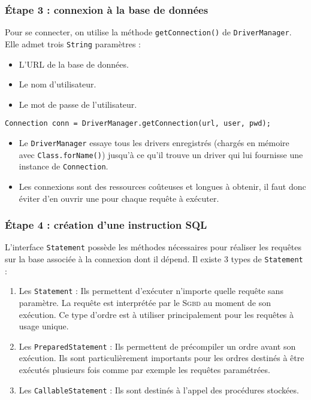 \documentclass[xcolor=pdftex,x11names,table]{beamer}
\begin{document}
    \begin{frame}
    \frametitle{Étape 3 : connexion à la base de données}
    	Pour se connecter, on utilise la méthode \lstinline$getConnection()$ de \lstinline$DriverManager$. 
    	Elle admet trois \lstinline$String$ paramètres :
    	\begin{itemize}
    		\item L’URL de la base de données.
				\item Le nom d'utilisateur.
				\item Le mot de passe de l'utilisateur.
			\end{itemize}
   		\pause
			\begin{block}{}
   			   	\lstinline$Connection conn = DriverManager.getConnection(url, user, pwd);$
 			\end{block}
    	\pause
    	\begin{itemize}
	      \item Le \lstinline$DriverManager$ essaye tous les drivers enregistrés (chargés en mémoire avec \lstinline$Class.forName()$) 
	      jusqu’à ce qu’il trouve un driver qui lui fournisse une instance de \lstinline$Connection$.
	      \item Les connexions sont des ressources coûteuses et longues à obtenir, il faut donc éviter 
	      d'en ouvrir une pour chaque requête à exécuter.
    	\end{itemize}  
    \end{frame}

    \begin{frame}
    \frametitle{Étape 4 : création d’une instruction SQL}
		  L'interface \lstinline$Statement$ possède les méthodes nécessaires pour réaliser les requêtes sur 
		  la base associée à la connexion dont il dépend. Il existe 3 types de \lstinline$Statement$ :\pause
		  \begin{enumerate}[<+->]
				\item Les \lstinline$Statement$ : Ils permettent d'exécuter n'importe quelle requête sans paramètre. La requête est 
				interprétée par le \textsc{Sgbd} au moment de son exécution. Ce type d'ordre est à utiliser principalement 
				pour les requêtes à usage unique.
				\item Les \lstinline$PreparedStatement$ : Ils permettent de précompiler un ordre avant son exécution. Ils sont 
				particulièrement importants pour les ordres destinés à être exécutés plusieurs fois comme par exemple les 
				requêtes paramétrées.
				\item Les \lstinline$CallableStatement$ : Ils sont destinés à l'appel des procédures stockées.
			\end{enumerate}
    \end{frame}
\end{document}
